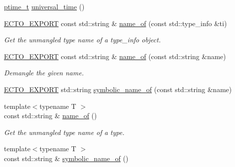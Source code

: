 \begin{DoxyCompactItemize}
\item 
\hyperlink{namespaceecto_a5bbe8fb0da047cb18d92eb9dfb469652}{ptime\-\_\-t} \hyperlink{namespaceecto_ad48a07c99914e7c96702bcce4baf6bc6}{universal\-\_\-time} ()
\item 
\hyperlink{util_8hpp_ab55b7868679cda60fc162580957fb98c}{E\-C\-T\-O\-\_\-\-E\-X\-P\-O\-R\-T} const std\-::string \& \hyperlink{namespaceecto_a980294f61090496ef65bc6b201f38944}{name\-\_\-of} (const std\-::type\-\_\-info \&ti)
\begin{DoxyCompactList}\small\item\em Get the unmangled type name of a type\-\_\-info object. \end{DoxyCompactList}\item 
\hyperlink{util_8hpp_ab55b7868679cda60fc162580957fb98c}{E\-C\-T\-O\-\_\-\-E\-X\-P\-O\-R\-T} const std\-::string \& \hyperlink{namespaceecto_ae8640f8758655b241efbd681cef5727f}{name\-\_\-of} (const std\-::string \&name)
\begin{DoxyCompactList}\small\item\em Demangle the given name. \end{DoxyCompactList}\item 
\hyperlink{util_8hpp_ab55b7868679cda60fc162580957fb98c}{E\-C\-T\-O\-\_\-\-E\-X\-P\-O\-R\-T} std\-::string \hyperlink{namespaceecto_a56b14793c548143a90d5bff5a7c279b8}{symbolic\-\_\-name\-\_\-of} (const std\-::string \&name)
\item 
{\footnotesize template$<$typename T $>$ }\\const std\-::string \& \hyperlink{namespaceecto_a2420930e76b8e95a3f241c4dc154f8f8}{name\-\_\-of} ()
\begin{DoxyCompactList}\small\item\em Get the unmangled type name of a type. \end{DoxyCompactList}\item 
{\footnotesize template$<$typename T $>$ }\\const std\-::string \& \hyperlink{namespaceecto_a1df1f18305fe27e87f2a845d02f31db9}{symbolic\-\_\-name\-\_\-of} ()
\end{DoxyCompactItemize}


